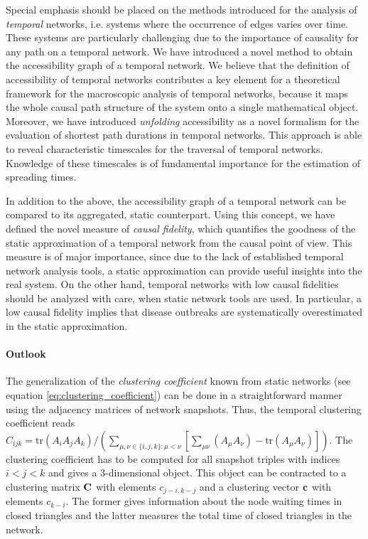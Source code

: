 Special emphasis should be placed on the methods introduced for the analysis of \emph{temporal} networks, i.e. systems where the occurrence of edges varies over time.
These systems are particularly challenging due to the importance of causality for any path on a temporal network.
We have introduced a novel method to obtain the accessibility graph of a temporal network.
We believe that the definition of accessibility of temporal networks contributes a key element for a theoretical framework for the macroscopic analysis of temporal networks, because it maps the whole causal path structure of the system onto a single mathematical object.
Moreover, we have introduced \emph{unfolding} accessibility as a novel formalism for the evaluation of shortest path durations in temporal networks.
This approach is able to reveal characteristic timescales for the traversal of temporal networks.
Knowledge of these timescales is of fundamental importance for the estimation of spreading times.

In addition to the above, the accessibility graph of a temporal network can be compared to its aggregated, static counterpart.
Using this concept, we have defined the novel measure of \emph{causal fidelity}, which quantifies the goodness of the static approximation of a temporal network from the causal point of view.
This measure is of major importance, since due to the lack of established temporal network analysis tools, a static approximation can provide useful insights into the real system.
On the other hand, temporal networks with low causal fidelities should be analyzed with care, when static network tools are used.
In particular, a low causal fidelity implies that disease outbreaks are systematically overestimated in the static approximation.


\paragraph{Outlook\color{Cayenne}{.}}
The generalization of the \emph{clustering coefficient} known from static networks (see equation \eqref{eq:clustering_coefficient}) can be done in a straightforward manner using the adjacency matrices of network snapshots.
Thus, the temporal clustering coefficient reads $C_{ijk}=\text{tr} (A_{i}A_{j}A_{k})/( \sum_{\mu,\nu\in\{i,j,k\}:\mu<\nu}\left[\sum _{\mu \nu }\left(A_{\mu}A_{\nu}\right)-\text{tr}\left(A_{\mu}A_{\nu}\right)\right])$.
The clustering coefficient has to be computed for all snapshot triples with indices $i<j<k$ and gives a 3-dimensional object.
This object can be contracted to a clustering matrix $\mathbf{C}$ with elements $c_{j-i,k-j}$ and a clustering vector $\mathbf{c}$ with elements $c_{k-i}$.
The former gives information about the node waiting times in closed triangles and the latter measures the total time of closed triangles in the network.

